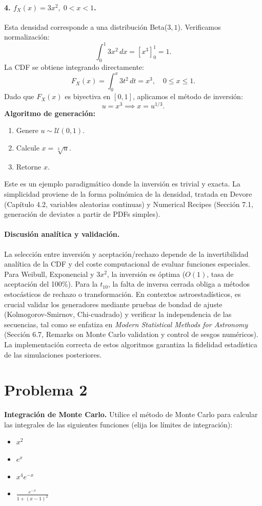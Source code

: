 \documentclass[12pt]{article}
\begin{document}
\paragraph{4. $f_X(x) = 3x^2, \; 0 < x < 1$.}
Esta densidad corresponde a una distribución Beta($3, 1$). Verificamos normalización:
$$
\int_0^1 3x^2 \, dx = \left[ x^3 \right]_0^1 = 1.
$$
La CDF se obtiene integrando directamente:
$$
F_X(x) = \int_0^x 3t^2 \, dt = x^3, \quad 0 \leq x \leq 1.
$$
Dado que $F_X(x)$ es biyectiva en $[0,1]$, aplicamos el método de inversión:
$$
u = x^3 \implies x = u^{1/3}.
$$
\textbf{Algoritmo de generación:}
\begin{enumerate}
    \item Genere $u \sim \mathcal{U}(0,1)$.
    \item Calcule $x = \sqrt[3]{u}$.
    \item Retorne $x$.
\end{enumerate}
Este es un ejemplo paradigmático donde la inversión es trivial y exacta. La simplicidad proviene de la forma polinómica de la densidad, tratada en Devore (Capítulo 4.2, variables aleatorias continuas) y Numerical Recipes (Sección 7.1, generación de deviates a partir de PDFs simples).

\paragraph{Discusión analítica y validación.}
La selección entre inversión y aceptación/rechazo depende de la invertibilidad analítica de la CDF y del coste computacional de evaluar funciones especiales. Para Weibull, Exponencial y $3x^2$, la inversión es óptima ($O(1)$, tasa de aceptación del 100\%). Para la $t_{10}$, la falta de inversa cerrada obliga a métodos estocásticos de rechazo o transformación. En contextos astroestadísticos, es crucial validar los generadores mediante pruebas de bondad de ajuste (Kolmogorov-Smirnov, Chi-cuadrado) y verificar la independencia de las secuencias, tal como se enfatiza en \textit{Modern Statistical Methods for Astronomy} (Sección 6.7, Remarks on Monte Carlo validation y control de sesgos numéricos). La implementación correcta de estos algoritmos garantiza la fidelidad estadística de las simulaciones posteriores.
    
\section{Problema 2}
\textbf{Integración de Monte Carlo.} Utilice el método de Monte Carlo para calcular las integrales de las siguientes funciones (elija los límites de integración):
\begin{itemize}
\item $x^2$
\item $e^x$
\item $x^4 e^{-x}$
\item $\frac{e^{-x}}{1 + (x - 1)^2}$
\end{itemize}
\end{document}
